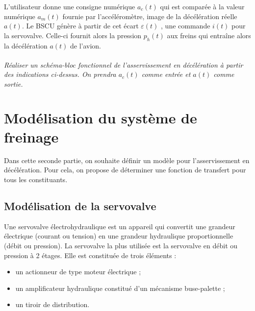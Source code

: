 \documentclass[10pt,oneside]{article}
\begin{document}
L'utilisateur donne une consigne numérique $a_c(t)$ qui est comparée à la valeur numérique $a_m(t)$
fournie par l'accéléromètre, image de la décélération réelle $a(t)$. Le BSCU génère à partir de cet écart
$\varepsilon(t)$ , une commande $i(t)$ pour la servovalve. Celle-ci fournit alors la pression $p_h(t)$ aux freins qui
entraîne alors la décélération $a(t)$ de l'avion.

\paragraph{}
\textit{Réaliser un schéma-bloc fonctionnel de l'asservissement en décélération à partir des
indications ci-dessus. On prendra $a_c(t)$ comme entrée et $a(t)$ comme sortie.}

\section{Modélisation du système de freinage}
Dans cette seconde partie, on souhaite définir un modèle pour l'asservissement en décélération. Pour cela,
on propose de déterminer une fonction de transfert pour tous les constituants.

\subsection{Modélisation de la servovalve}

Une servovalve électrohydraulique est un appareil qui convertit une grandeur électrique (courant ou
tension) en une grandeur hydraulique proportionnelle (débit ou pression).
La servovalve la plus utilisée est la servovalve en débit ou pression à 2 étages. Elle est constituée de trois
éléments :
\begin{itemize}
\item un actionneur de type moteur électrique ;
\item un amplificateur hydraulique constitué d’un mécanisme buse-palette ;
\item un tiroir de distribution.
\end{itemize}
\end{document}
